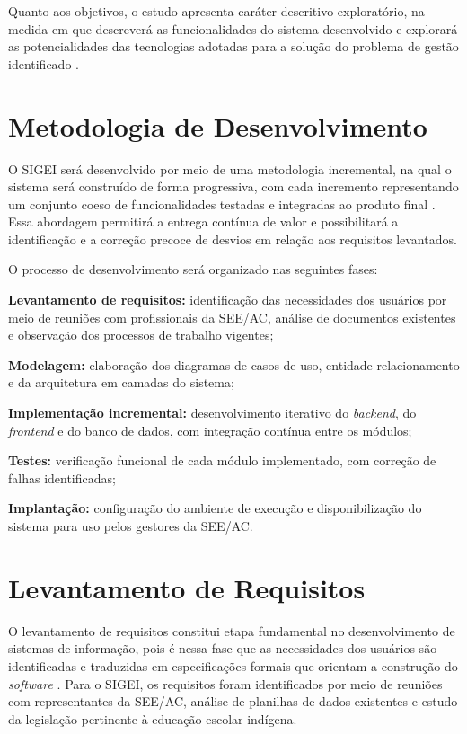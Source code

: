 \documentclass[12pt,a4paper,oneside]{abntspiifac}
\begin{document}
Quanto aos objetivos, o estudo apresenta caráter descritivo-exploratório, na medida em que descreverá as funcionalidades do sistema desenvolvido e explorará as potencialidades das tecnologias adotadas para a solução do problema de gestão identificado \cite{gil2008}.

\section{Metodologia de Desenvolvimento}

O SIGEI será desenvolvido por meio de uma metodologia incremental, na qual o sistema será construído de forma progressiva, com cada incremento representando um conjunto coeso de funcionalidades testadas e integradas ao produto final \cite{pressman2016}. Essa abordagem permitirá a entrega contínua de valor e possibilitará a identificação e a correção precoce de desvios em relação aos requisitos levantados.

O processo de desenvolvimento será organizado nas seguintes fases:

\begin{alineas}
  \item \textbf{Levantamento de requisitos:} identificação das necessidades dos usuários por meio de reuniões com profissionais da SEE/AC, análise de documentos existentes e observação dos processos de trabalho vigentes;
  \item \textbf{Modelagem:} elaboração dos diagramas de casos de uso, entidade-relacionamento e da arquitetura em camadas do sistema;
  \item \textbf{Implementação incremental:} desenvolvimento iterativo do \textit{backend}, do \textit{frontend} e do banco de dados, com integração contínua entre os módulos;
  \item \textbf{Testes:} verificação funcional de cada módulo implementado, com correção de falhas identificadas;
  \item \textbf{Implantação:} configuração do ambiente de execução e disponibilização do sistema para uso pelos gestores da SEE/AC.
\end{alineas}

\section{Levantamento de Requisitos}

O levantamento de requisitos constitui etapa fundamental no desenvolvimento de sistemas de informação, pois é nessa fase que as necessidades dos usuários são identificadas e traduzidas em especificações formais que orientam a construção do \textit{software} \cite{sommerville2019}. Para o SIGEI, os requisitos foram identificados por meio de reuniões com representantes da SEE/AC, análise de planilhas de dados existentes e estudo da legislação pertinente à educação escolar indígena.
\end{document}
